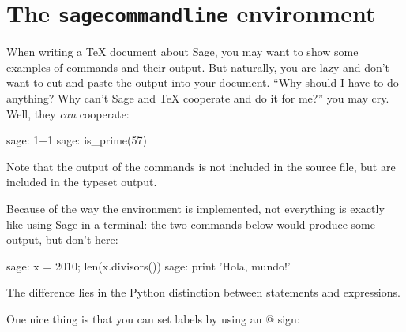 \documentclass{article}
\begin{document}
\begin{comment}
\begin{sageblock}
  x = lambda t: t
  y(t) = t*sin(1/t)
  gnuplot(x, y, [0.01, 0.02..(0.5)] + [0.55, 0.6..2], 'example-tikz2.table')
\end{sageblock}

\begin{tikzpicture}
 \draw[very thin,->] (-0.25,0) -- (2,0);
 \draw[very thin,->] (0,-1/3) -- (0,1);
 \draw[smooth, red] plot file {example-tikz2.table};
\end{tikzpicture}

This style of plotting will become even more useful and powerful when
the new TikZ Data Visualization library is available---you will be able
to feed TikZ a bunch of data points, and it automatically make a very
nice plot for you, including axes, labels, and so on.

\end{comment}

\section{The \texttt{sagecommandline} environment}

When writing a \TeX{} document about Sage, you may want to show some
examples of commands and their output. But naturally, you are lazy and
don't want to cut and paste the output into your document. ``Why should
I have to do anything? Why can't Sage and \TeX{} cooperate and do it for
me?'' you may cry. Well, they \emph{can} cooperate:

\begin{sagecommandline}
  sage: 1+1
  sage: is_prime(57)
\end{sagecommandline}

Note that the output of the commands is not included in the source file,
but are included in the typeset output.

Because of the way the environment is implemented, not everything is
exactly like using Sage in a terminal: the two commands below would
produce some output, but don't here:

\begin{sagecommandline}
  sage: x = 2010; len(x.divisors())
  sage: print 'Hola, mundo!'
\end{sagecommandline}

The difference lies in the Python distinction between statements and
expressions.

One nice thing is that you can set labels by using an @ sign:
\end{document}
